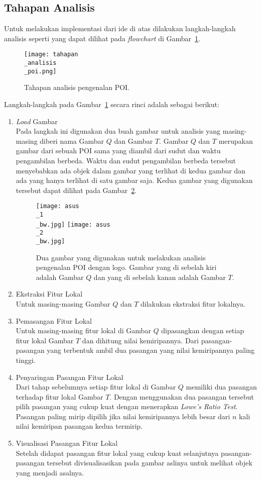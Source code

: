 \subsection{Tahapan Analisis}  
Untuk melakukan implementasi dari ide di atas dilakukan langkah-langkah analisis seperti yang dapat dilihat pada \textit{flowchart} di Gambar~\ref{fig:tahapan_analisis_poi}.

\begin{figure}[H]
	\centering
	\texttt{[image: tahapan\\\_analisis\\\_poi.png]}
	\caption{Tahapan analisis pengenalan POI.}
	\label{fig:tahapan_analisis_poi}
\end{figure}

Langkah-langkah pada Gambar~\ref{fig:tahapan_analisis_poi} secara rinci adalah sebagai berikut:
\begin{enumerate}
	\item \textit{Load} Gambar \\
	Pada langkah ini digunakan dua buah gambar untuk analisis yang masing-masing diberi nama Gambar $Q$ dan Gambar $T$. Gambar $Q$ dan $T$ merupakan gambar dari sebuah POI sama yang diambil dari sudut dan waktu pengambilan berbeda. Waktu dan sudut pengambilan berbeda tersebut menyebabkan ada objek dalam gambar yang terlihat di kedua gambar dan ada yang hanya terlihat di satu gambar saja. Kedua gambar yang digunakan tersebut dapat dilihat pada Gambar~\ref{fig:analisis_asus}.
	\vspace{-8pt}
	\begin{figure}[H]
		\centering
		\texttt{[image: asus\\\_1\\\_bw.jpg]}
		\texttt{[image: asus\\\_2\\\_bw.jpg]}
		\caption{Dua gambar yang digunakan untuk melakukan analisis pengenalan POI dengan logo. Gambar yang di sebelah kiri adalah Gambar $Q$ dan yang di sebelah kanan adalah Gambar $T$.}
		\label{fig:analisis_asus}
	\end{figure}
	\vspace{-8pt}
	\item Ekstraksi Fitur Lokal \\
	Untuk masing-masing Gambar $Q$ dan $T$ dilakukan ekstraksi fitur lokalnya.
	\item Pemasangan Fitur Lokal \\
	Untuk masing-masing fitur lokal di Gambar $Q$ dipasangkan dengan setiap fitur lokal Gambar $T$ dan dihitung nilai kemiripannya. Dari pasangan-pasangan yang terbentuk ambil dua pasangan yang nilai kemiripannya paling tinggi.
	\item Penyaringan Pasangan Fitur Lokal \\
	Dari tahap sebelumnya setiap fitur lokal di Gambar $Q$ memiliki dua pasangan terhadap fitur lokal Gambar $T$. Dengan menggunakan dua pasangan tersebut pilih pasangan yang cukup kuat dengan menerapkan \textit{Lowe's Ratio Test}. Pasangan paling mirip dipilih jika nilai kemiripannya lebih besar dari $n$ kali nilai kemiripan pasangan kedua termirip.
	\item Visualisasi Pasangan Fitur Lokal \\
	Setelah didapat pasangan fitur lokal yang cukup kuat selanjutnya pasangan-pasangan tersebut divisualisasikan pada gambar aslinya untuk melihat objek yang menjadi asalnya.
\end{enumerate}

